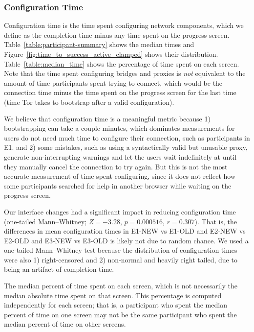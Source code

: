 \documentclass[USenglish,oneside,twocolumn]{article}
\begin{document}
\subsubsection{Configuration Time} 
Configuration time is the time spent configuring network components, which we define as the completion time minus any time spent on the progress screen. Table~\ref{table:participant-summary} shows the median times and Figure~\ref{fig:time_to_success_active_clamped} shows their distribution. Table~\ref{table:median_time} shows the percentage of time spent on each screen. Note that the time spent configuring bridges and proxies is {\it not} equivalent to the amount of time participants spent trying to connect, which would be the connection time minus the time spent on the progress screen for the last time (time Tor takes to bootstrap after a valid configuration). 

We believe that configuration time is a meaningful metric because 1) bootstrapping can take a couple minutes, which dominates measurements for users do not need much time to configure their connection, such as participants in E1. and 2) some mistakes, such as using a syntactically valid but unusable proxy, generate non-interrupting warnings and let the users wait indefinitely at until they manually cancel the connection to try again. But this is not the most accurate measurement of time spent configuring, since it does not reflect how some participants searched for help in another browser while waiting on the progress screen.

Our interface changes had a significant impact in reducing configuration time (one-tailed Mann--Whitney; $Z = -3.28$, $p = 0.000516$, $r = 0.307$). That is, the differences in mean configuration times in E1-NEW vs E1-OLD and E2-NEW vs E2-OLD and E3-NEW vs E3-OLD is likely not due to random chance. We used a one-tailed Mann--Whitney test because the distribution of configuration times were also 1) right-censored and 2) non-normal and heavily right tailed, due to being an artifact of completion time. 

\begin{table}[t]
\centering

\caption{The median percent of time spent on each screen, which is not
necessarily the median absolute time spent on that screen. 
This percentage is computed independently for each screen; that is, a participant who spent the median percent 
of time on one screen may not be the same participant who spent the median percent
of time on other screens.} 
\label{table:median_time}
\end{table}
\end{document}
